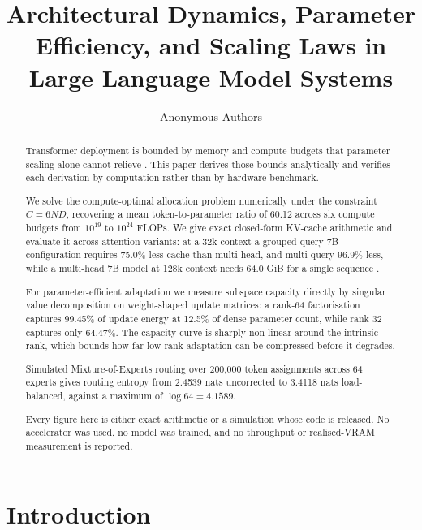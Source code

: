 \documentclass[10pt,twocolumn,letterpaper]{article}
\begin{document}
\title{Architectural Dynamics, Parameter Efficiency, and Scaling Laws in Large Language Model Systems}

\author{
Anonymous Authors
}

\maketitle

\begin{abstract}
Transformer deployment is bounded by memory and compute budgets that parameter scaling alone cannot relieve \cite{arxiv_2005_14165,arxiv_2406_00584}. This paper derives those bounds analytically and verifies each derivation by computation rather than by hardware benchmark.

We solve the compute-optimal allocation problem numerically under the constraint $C = 6ND$, recovering a mean token-to-parameter ratio of 60.12 across six compute budgets from $10^{19}$ to $10^{24}$ FLOPs. We give exact closed-form KV-cache arithmetic and evaluate it across attention variants: at a 32k context a grouped-query 7B configuration requires 75.0\% less cache than multi-head, and multi-query 96.9\% less, while a multi-head 7B model at 128k context needs 64.0 GiB for a single sequence \cite{arxiv_2404_01131}.

For parameter-efficient adaptation we measure subspace capacity directly by singular value decomposition on weight-shaped update matrices: a rank-64 factorisation captures 99.45\% of update energy at 12.5\% of dense parameter count, while rank 32 captures only 64.47\%. The capacity curve is sharply non-linear around the intrinsic rank, which bounds how far low-rank adaptation can be compressed before it degrades.

Simulated Mixture-of-Experts routing over 200{,}000 token assignments across 64 experts gives routing entropy from 2.4539 nats uncorrected to 3.4118 nats load-balanced, against a maximum of $\log 64 = 4.1589$.

Every figure here is either exact arithmetic or a simulation whose code is released. No accelerator was used, no model was trained, and no throughput or realised-VRAM measurement is reported.
\end{abstract}






\section{Introduction}
\end{document}
